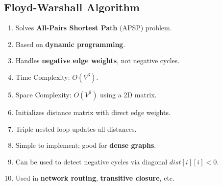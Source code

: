 \documentclass[14pt,a4paper]{extarticle}
\begin{document}
\vspace{1em}

\subsection{Floyd-Warshall Algorithm}
\begin{enumerate}[leftmargin=1.5em, label=\textbf{\arabic*.}]
    \item Solves \textbf{All-Pairs Shortest Path} (APSP) problem.
    \item Based on \textbf{dynamic programming}.
    \item Handles \textbf{negative edge weights}, not negative cycles.
    \item Time Complexity: \( O(V^3) \).
    \item Space Complexity: \( O(V^2) \) using a 2D matrix.
    \item Initializes distance matrix with direct edge weights.
    \item Triple nested loop updates all distances.
    \item Simple to implement; good for \textbf{dense graphs}.
    \item Can be used to detect negative cycles via diagonal \( dist[i][i] < 0 \).
    \item Used in \textbf{network routing}, \textbf{transitive closure}, etc.
\end{enumerate}
\end{document}
